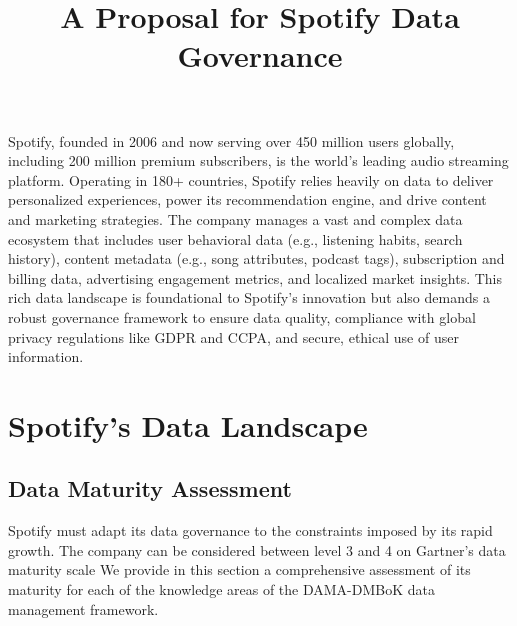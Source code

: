 \documentclass[11pt,a4paper,computermodern]{article}
\title{A Proposal for Spotify Data Governance}
\date{}
\begin{document}
\maketitle

\vspace{-10mm}

Spotify, founded in 2006 and now serving over 450 million users globally, including 200 million premium subscribers, is the world’s leading audio streaming platform. Operating in 180+ countries, Spotify relies heavily on data to deliver personalized experiences, power its recommendation engine, and drive content and marketing strategies. The company manages a vast and complex data ecosystem that includes user behavioral data (e.g., listening habits, search history), content metadata (e.g., song attributes, podcast tags), subscription and billing data, advertising engagement metrics, and localized market insights. This rich data landscape is foundational to Spotify’s innovation but also demands a robust governance framework to ensure data quality, compliance with global privacy regulations like GDPR and CCPA, and secure, ethical use of user information.


\section{Spotify's Data Landscape}

\subsection*{Data Maturity Assessment}

Spotify must adapt its data governance to the constraints imposed by its rapid growth. The company can be considered between level 3 and 4 on Gartner's data maturity scale We provide in this section a comprehensive assessment of its maturity for each of the knowledge areas of the DAMA-DMBoK data management framework.
\end{document}
